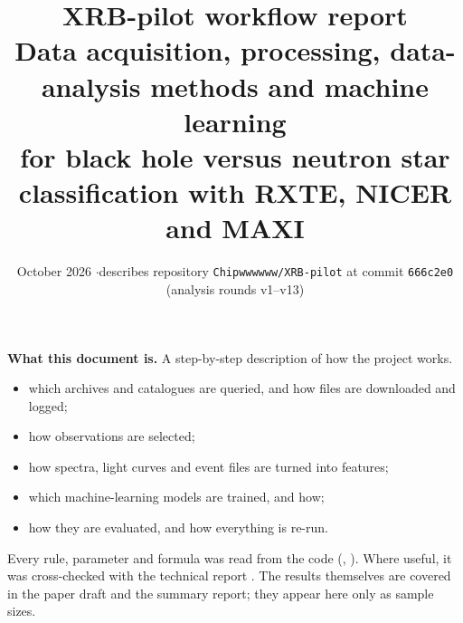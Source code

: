 \documentclass[11pt,a4paper]{article}
\title{\textbf{XRB-pilot workflow report}\\[4pt]
\large Data acquisition, processing, data-analysis methods and machine learning\\
for black hole versus neutron star classification with RXTE, NICER and MAXI}
\author{}
\date{October 2026 \quad$\cdot$\quad describes repository \texttt{Chipwwwwww/XRB-pilot} at commit \texttt{666c2e0} (analysis rounds v1--v13)}
\begin{document}
\maketitle
\thispagestyle{fancy}

\begin{center}
\begin{minipage}{0.9\textwidth}
\small
\textbf{What this document is.} A step-by-step description of how the project works.
\begin{itemize}
\item which archives and catalogues are queried, and how files are downloaded and logged;
\item how observations are selected;
\item how spectra, light curves and event files are turned into features;
\item which machine-learning models are trained, and how;
\item how they are evaluated, and how everything is re-run.
\end{itemize}
Every rule, parameter and formula was read from the code (, ). Where useful, it was
cross-checked with the technical report . The results themselves are covered in the paper draft
and the summary report; they appear here only as sample sizes.
\end{minipage}
\end{center}

\tableofcontents
\clearpage











\appendix




\end{document}

